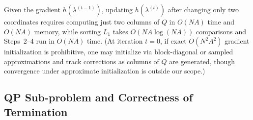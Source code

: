 \documentclass[11pt,letterpaper]{article}
\theoremstyle{definition}
\begin{document}
Given the gradient $h(\lambda^{(t-1)})$, updating $h(\lambda^{(t)})$ after changing only two coordinates requires computing just two columns of $Q$ in $O(NA)$ time and $O(NA)$ memory, while sorting $L_1$ takes $O(NA\log(NA))$ comparisons and Steps~2--4 run in $O(NA)$ time. (At iteration $t=0$, if exact $O(N^2A^2)$ gradient initialization is prohibitive, one may initialize via block-diagonal or sampled approximations and track corrections as columns of $Q$ are generated, though convergence under approximate initialization is outside our scope.)

\subsection{QP Sub-problem and Correctness of Termination}
\label{sec:subproblem}
\end{document}
